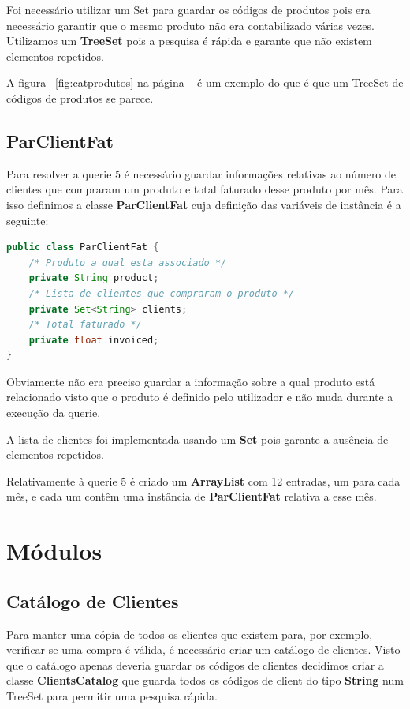 \documentclass[10pt] {article}
\begin{document}
\par Foi necessário utilizar um Set para guardar os códigos de produtos pois era necessário garantir que o mesmo produto 
não era contabilizado várias vezes. Utilizamos um \textbf{TreeSet} pois a pesquisa é rápida e garante que não existem 
elementos repetidos.
\par A figura ~\ref{fig:catprodutos} na página ~\pageref{fig:catprodutos} é um exemplo do que é que um TreeSet de 
códigos de produtos se parece.

\subsection{ParClientFat}
\par Para resolver a querie 5 é necessário guardar informações relativas ao número de clientes que compraram um produto 
e total faturado desse produto por mês. Para isso definimos a classe \textbf{ParClientFat} cuja definição das variáveis de 
instância é a seguinte: 

\begin{lstlisting}[language=Java]
public class ParClientFat {
	/* Produto a qual esta associado */
	private String product;
	/* Lista de clientes que compraram o produto */
	private Set<String> clients;
	/* Total faturado */
	private float invoiced;
}
\end{lstlisting}

\par Obviamente não era preciso guardar a informação sobre a qual produto está relacionado visto que o produto é definido 
pelo utilizador e não muda durante a execução da querie.
\par A lista de clientes foi implementada usando um \textbf{Set} pois garante a ausência de elementos repetidos.
\par Relativamente à querie 5 é criado um \textbf{ArrayList} com 12 entradas, um para cada mês, e cada um contêm uma 
instância de \textbf{ParClientFat} relativa a esse mês.

\newpage
\section{Módulos}
\subsection{Catálogo de Clientes}
\par Para manter uma cópia de todos os clientes que existem para, por exemplo, verificar se uma compra é válida, é necessário 
criar um catálogo de clientes. Visto que o catálogo apenas deveria guardar os códigos de clientes decidimos criar a classe 
\textbf{ClientsCatalog} que guarda todos os códigos de client do tipo \textbf{String} num TreeSet para permitir uma pesquisa 
rápida.
\end{document}
